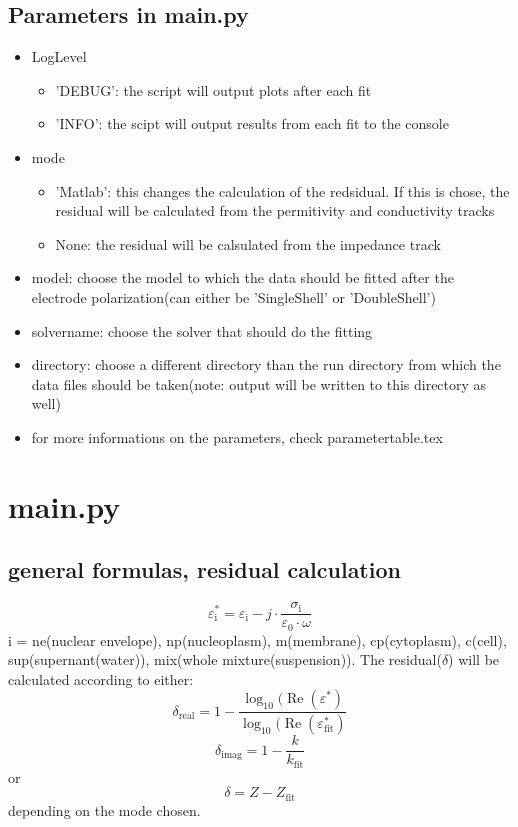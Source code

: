 \documentclass[10pt,a4paper]{article}
\renewcommand{\*}{\cdot}
\begin{document}
{\subsection{Parameters in main.py}{
\begin{itemize}
\item LogLevel \begin{itemize}
\item 'DEBUG': the script will output plots after each fit
\item 'INFO': the scipt will output results from each fit to the console
\end{itemize}
\item mode \begin{itemize}
\item 'Matlab': this changes the calculation of the redsidual. If this is chose, the residual will be calculated from the permitivity and conductivity tracks
\item None:  the residual will be calsulated from the impedance track
\end{itemize}
\item model: choose the model to which the data should be fitted after the electrode polarization(can either be 'SingleShell' or 'DoubleShell')
\item solvername: choose the solver that should do the fitting
\item directory: choose a different directory than the run directory from which the data files should be taken(note: output will be written to this directory as well)
\item for more informations on the parameters, check parametertable.tex
\end{itemize}
}
}%
\section{main.py}
\subsection{general formulas, residual calculation}
\begin{equation}
\varepsilon_\mathrm{i}^\ast = \varepsilon_\mathrm{i} - j\*\frac{\sigma_\mathrm{i}}{\varepsilon_\mathrm{0}\*\omega}
\end{equation}
i = ne(nuclear envelope), np(nucleoplasm), m(membrane), cp(cytoplasm), c(cell), sup(supernant(water)), mix(whole mixture(suspension)). \newline
The residual($\delta$) will be calculated according to either: 
\begin{equation}
\delta_\mathrm{real} = 1-\frac{\log_\mathrm{10}(\operatorname{Re}(\varepsilon^\ast)}{\log_\mathrm{10}(\operatorname{Re}(\varepsilon^\ast_\mathrm{fit})}
\end{equation}
\begin{equation}
\delta_\mathrm{imag} = 1- \frac{k}{k_\mathrm{fit}}
\end{equation}
or 
\begin{equation}
\delta = Z - Z_\mathrm{fit}
\end{equation}
depending on the mode chosen. 
\end{document}
